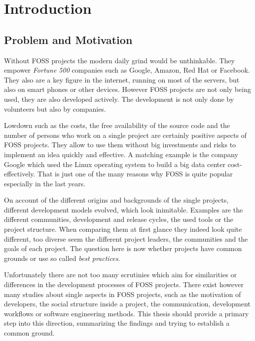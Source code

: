 \chapter{Introduction} %
\label{chap:introduction}

\section{Problem and Motivation} %

Without \ac{FOSS} projects the modern daily grind would be unthinkable. They
empower \emph{Fortune 500} companies such as Google, Amazon, Red Hat or
Facebook. They also are a key figure in the internet, running on most of the
servers, but also on smart phones or other devices. However \ac{FOSS} projects
are not only being used, they are also developed actively. The development is
not only done by volunteers but also by companies.

Lowdown such as the costs, the free availability of the source code and the
number of persons who work on a single project are certainly positive aspects
of \ac{FOSS} projects. They allow to use them without big investments and risks
to implement an idea quickly and effective. A matching example is the company
Google which used the Linux operating system to build a big data center
cost-effectively. That is just one of the many reasons why \ac{FOSS} is quite
popular especially in the last years.

On account of the different origins and backgrounds of the single projects,
different development models evolved, which look inimitable. Examples are the
different communities, development and release cycles, the used tools or the
project structure. When comparing them at first glance they indeed look quite
different, too diverse seem the different project leaders, the communities and
the goals of each project. The question here is now whether projects have
common grounds or use so called \emph{best practices}.

Unfortunately there are not too many scrutinies which aim for similarities or
differences in the development processes of \ac{FOSS} projects. There exist
however many studies about single aspects in \ac{FOSS} projects, such as the
motivation of developers, the social structure inside a project, the
communication, development workflows or software engineering methods. This thesis
should provide a primary step into this direction, summarizing the findings and
trying to establish a common ground.

